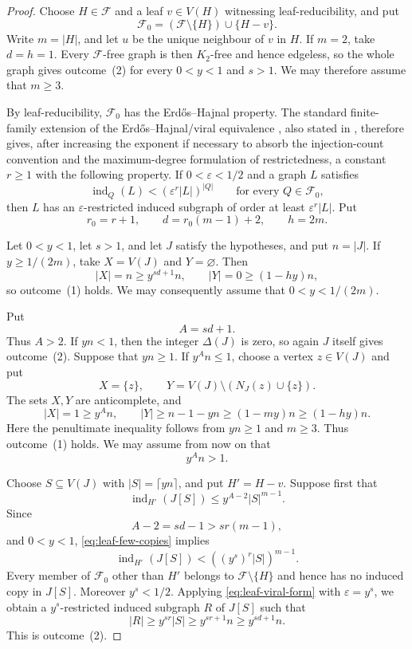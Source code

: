 \documentclass[11pt]{article}
\numberwithin{equation}{section}
\theoremstyle{plain}
\theoremstyle{definition}
\begin{document}
\begin{proof}
Choose $H\in\mathcal F$ and a leaf $v\in V(H)$ witnessing
leaf-reducibility, and put
\[
 \mathcal F_0=(\mathcal F\setminus\{H\})\cup\{H-v\}.
\]
Write $m=|H|$, and let $u$ be the unique neighbour of $v$ in $H$.
If $m=2$, take $d=h=1$.  Every $\mathcal F$-free graph is then
$K_2$-free and hence edgeless, so the whole graph gives outcome~(2)
for every $0<y<1$ and $s>1$.  We may therefore assume that $m\geq3$.

By leaf-reducibility, $\mathcal F_0$ has the Erd\H{o}s--Hajnal
property.  The standard finite-family extension of the
Erd\H{o}s--Hajnal/viral equivalence
\cite[Theorem~4]{BucicFoxPham2024}, also stated in
\cite[Theorem~1.3]{HuangJuZhou2026}, therefore gives, after increasing the exponent
if necessary to absorb the injection-count convention and the
maximum-degree formulation of restrictedness, a constant $r\geq1$
with the following property.  If $0<\varepsilon<1/2$ and a graph $L$
satisfies
\begin{equation}
 \operatorname{ind}_Q(L)<
       (\varepsilon^r|L|)^{|Q|}
       \qquad\text{for every }Q\in\mathcal F_0,
\label{eq:leaf-viral-form}
\end{equation}
then $L$ has an $\varepsilon$-restricted induced subgraph of order at
least $\varepsilon^r|L|$.  Put
\[
                   r_0=r+1,\qquad d=r_0(m-1)+2,\qquad h=2m.
\]

Let $0<y<1$, let $s>1$, and let $J$ satisfy the hypotheses, and put
$n=|J|$.  If $y\geq1/(2m)$, take
$X=V(J)$ and $Y=\varnothing$.  Then
\[
 |X|=n\geq y^{sd+1}n,\qquad |Y|=0\geq(1-hy)n,
\]
so outcome~(1) holds.  We may consequently assume that
$0<y<1/(2m)$.

Put
\[
                              A=sd+1.
\]
Thus $A>2$.  If $yn<1$, then the integer $\Delta(J)$ is zero, so again
$J$ itself gives outcome~(2).  Suppose that $yn\geq1$.  If
$y^An\leq1$, choose a vertex $z\in V(J)$ and put
\[
 X=\{z\},\qquad
 Y=V(J)\setminus(N_J(z)\cup\{z\}).
\]
The sets $X,Y$ are anticomplete, and
\[
 |X|=1\geq y^An,\qquad
 |Y|\geq n-1-yn\geq(1-my)n\geq(1-hy)n.
\]
Here the penultimate inequality follows from $yn\geq1$ and $m\geq3$.
Thus outcome~(1) holds.  We may assume from now on that
\begin{equation}
                              y^An>1.
\label{eq:leaf-nontrivial}
\end{equation}

Choose $S\subseteq V(J)$ with $|S|=\lceil yn\rceil$, and put
$H'=H-v$.  Suppose first that
\begin{equation}
 \operatorname{ind}_{H'}(J[S])
       \leq y^{A-2}|S|^{m-1}.
\label{eq:leaf-few-copies}
\end{equation}
Since
\[
 A-2=sd-1>s r(m-1),
\]
and $0<y<1$, \eqref{eq:leaf-few-copies} implies
\[
 \operatorname{ind}_{H'}(J[S])
       <((y^s)^r|S|)^{m-1}.
\]
Every member of $\mathcal F_0$ other than $H'$ belongs to
$\mathcal F\setminus\{H\}$ and hence has no induced copy in $J[S]$.
Moreover $y^s<1/2$.  Applying \eqref{eq:leaf-viral-form} with
$\varepsilon=y^s$, we obtain a $y^s$-restricted induced subgraph $R$
of $J[S]$ such that
\[
 |R|\geq y^{sr}|S|
      \geq y^{sr+1}n
      \geq y^{sd+1}n.
\]
This is outcome~(2).


\end{proof}
\end{document}
